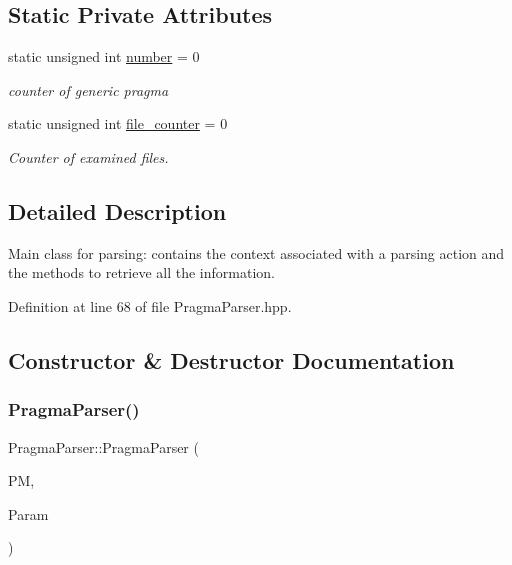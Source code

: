 \subsection*{Static Private Attributes}
\begin{DoxyCompactItemize}
\item 
static unsigned int \hyperlink{classPragmaParser_a9a81b9f19ab3820b1b19adc4e73b2919}{number} = 0
\begin{DoxyCompactList}\small\item\em counter of generic pragma \end{DoxyCompactList}\item 
static unsigned int \hyperlink{classPragmaParser_a9c1104c9516060f9831ba5a3ab724fae}{file\+\_\+counter} = 0
\begin{DoxyCompactList}\small\item\em Counter of examined files. \end{DoxyCompactList}\end{DoxyCompactItemize}


\subsection{Detailed Description}
Main class for parsing\+: contains the context associated with a parsing action and the methods to retrieve all the information. 

Definition at line 68 of file Pragma\+Parser.\+hpp.



\subsection{Constructor \& Destructor Documentation}
\mbox{\label{classPragmaParser_a34a232bfaef4e229d656ab163a9e4666}} 
\subsubsection{\texorpdfstring{Pragma\+Parser()}{PragmaParser()}}
{\footnotesize\ttfamily Pragma\+Parser\+::\+Pragma\+Parser (\begin{DoxyParamCaption}\item[{const \hyperlink{pragma__manager_8hpp_a6eb2deb9c5e77014dd1702c2971b1921}{pragma\+\_\+manager\+Ref}}]{PM,  }\item[{const \hyperlink{Parameter_8hpp_a37841774a6fcb479b597fdf8955eb4ea}{Parameter\+Const\+Ref}}]{Param }\end{DoxyParamCaption})}



